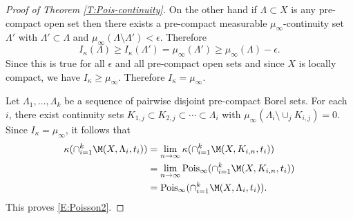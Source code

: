 \documentclass[12pt]{article}
\theoremstyle{plain}
\theoremstyle{definition}
\theoremstyle{remark}
\def\cA{{\mathcal{A}}} \def\cB{{\mathcal{B}}} \def\cC{{\mathcal{C}}} \def\cD{{\mathcal{D}}} \def\cE{{\mathcal{E}}} \def\cF{{\mathcal{F}}} \def\cG{{\mathcal{G}}} \def\cH{{\mathcal{H}}} \def\cI{{\mathcal{I}}} \def\cJ{{\mathcal{J}}} \def\cK{{\mathcal{K}}} \def\cL{{\mathcal{L}}} \def\cM{{\mathcal{M}}} \def\cN{{\mathcal{N}}} \def\cO{{\mathcal{O}}} \def\cP{{\mathcal{P}}} \def\cQ{{\mathcal{Q}}} \def\cR{{\mathcal{R}}} \def\cS{{\mathcal{S}}} \def\cT{{\mathcal{T}}} \def\cU{{\mathcal{U}}} \def\cV{{\mathcal{V}}} \def\cW{{\mathcal{W}}} \def\cX{{\mathcal{X}}} \def\cY{{\mathcal{Y}}} \def\cZ{{\mathcal{Z}}}
\newcommand{\eps}{\epsilon}
\renewcommand\k{\kappa}
\newcommand\Pois{\operatorname{Pois}}
\begin{document}
\begin{proof}[Proof of Theorem \ref{T:Pois-continuity}]
On the other hand if $\Lambda\subset X$ is any pre-compact open set then there exists a pre-compact measurable $\mu_\infty$-continuity set $\Lambda'$ with $\Lambda' \subset \Lambda$ and $\mu_\infty(\Lambda \setminus \Lambda')<\eps$. 
Therefore
$$I_\kappa(\Lambda) \ge I_\kappa(\Lambda') = \mu_\infty(\Lambda') \ge \mu_\infty(\Lambda)-\eps.$$
Since this is true for all $\eps$ and all pre-compact open sets and since $X$ is locally compact, we have $I_\kappa \ge \mu_\infty$. Therefore $I_\kappa=\mu_\infty$.



Let $\Lambda_1,\ldots, \Lambda_k$ be a sequence of pairwise disjoint pre-compact Borel sets. For each $i$, there  exist continuity sets $K_{1,j}\subset K_{2,j} \subset \cdots \subset \Lambda_i$ with $\mu_\infty(\Lambda_i \setminus \cup_j K_{i,j})=0$. Since $I_\k=\mu_\infty$, it follows that
\begin{align*}
    \k(\cap_{i=1}^k \M(X,\Lambda_i, t_i)) &= \lim_{n\to\infty}  \k(\cap_{i=1}^k \M(X,K_{i,n}, t_i)) \\
    &= \lim_{n\to\infty}  \Pois_\infty(\cap_{i=1}^k \M(X,K_{i,n}, t_i)) \\
    &= \Pois_\infty(\cap_{i=1}^k \M(X,\Lambda_i, t_i)).
\end{align*}
This proves \eqref{E:Poisson2}.
\end{proof}
\end{document}
